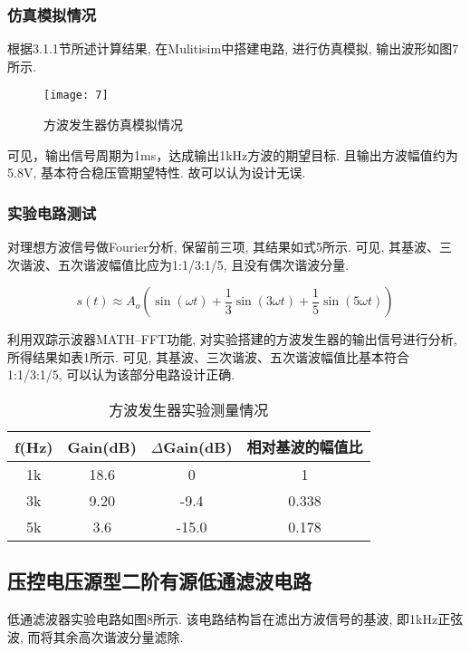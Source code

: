 \documentclass[UTF2]{ctexart}
\begin{document}
	\subsubsection{仿真模拟情况}
	
	根据3.1.1节所述计算结果, 在Mulitisim中搭建电路, 进行仿真模拟, 输出波形如图7所示. 
	\begin{figure}[h]
		\centering
		\texttt{[image: 7]}
		\caption{方波发生器仿真模拟情况}
	\end{figure}
	可见，输出信号周期为1ms，达成输出1kHz方波的期望目标. 且输出方波幅值约为5.8V, 基本符合稳压管期望特性. 故可以认为设计无误.
	
	\subsubsection{实验电路测试}
	
	对理想方波信号做Fourier分析, 保留前三项, 其结果如式5所示. 可见, 其基波、三次谐波、五次谐波幅值比应为1:1/3:1/5, 且没有偶次谐波分量. 
	
	\begin{equation}
		s(t) \approx A_o \left( \sin(\omega t) + \frac{1}{3} \sin(3\omega t) + \frac{1}{5} \sin(5\omega t) \right)
	\end{equation}
	
	利用双踪示波器MATH--FFT功能, 对实验搭建的方波发生器的输出信号进行分析, 所得结果如表1所示. 可见, 其基波、三次谐波、五次谐波幅值比基本符合1:1/3:1/5, 可以认为该部分电路设计正确.
	
	\begin{table}[h]
		\centering
		\caption{方波发生器实验测量情况}
		\begin{tabular}{c c c c}
			\hline
			f(Hz) & Gain(dB) & $\Delta$Gain(dB) & 相对基波的幅值比 \\
			\hline
			1k & 18.6 & 0 & 1\\
			3k & 9.20 & -9.4 & 0.338\\
			5k & 3.6 & -15.0 & 0.178\\
			\hline
		\end{tabular}
	\end{table}
	
	\subsection{压控电压源型二阶有源低通滤波电路}
	
	低通滤波器实验电路如图8所示. 该电路结构旨在滤出方波信号的基波, 即1kHz正弦波, 而将其余高次谐波分量滤除.
	
\end{document}
